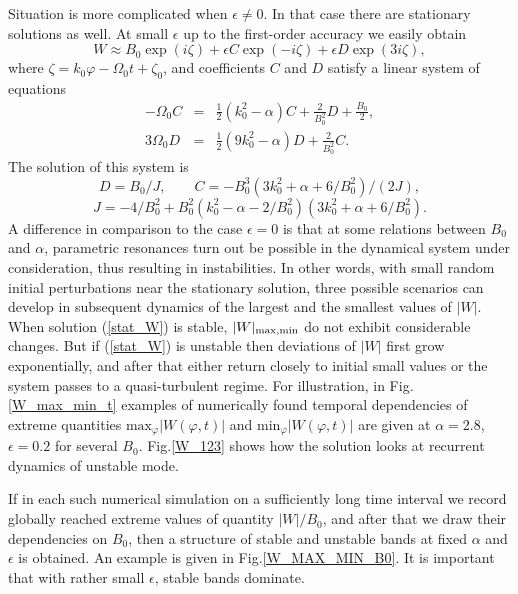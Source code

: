 \documentclass[pra,twocolumn,showpacs]{revtex4}
\begin{document}
Situation is more complicated when  $\epsilon\neq 0$. In that case there are stationary solutions 
as well. At small $\epsilon$ up to the first-order accuracy we easily obtain
\begin{equation}
W\approx B_0\exp(i\zeta)+\epsilon C\exp(-i\zeta) +\epsilon D\exp(3i\zeta),
\label{stat_W}
\end{equation}
where $\zeta=k_0\varphi -\Omega_0 t +\zeta_0$, and coefficients $C$ and $D$ 
satisfy a linear system of equations
\begin{eqnarray}
-\Omega_0 C&=&\frac{1}{2}(k_0^2-\alpha)C +\frac{2}{B_0^2} D+\frac{B_0}{2},\\
3\Omega_0 D&=&\frac{1}{2}(9k_0^2-\alpha)D +\frac{2}{B_0^2} C.
\end{eqnarray}
The solution of this system is
\begin{equation}
D=B_0/J, \qquad C=-B_0^3(3k_0^2+\alpha+6/B_0^2)/(2J), 
\end{equation}
\begin{equation}
J=-4/B_0^2+B_0^2(k_0^2-\alpha-2/B_0^2)(3k_0^2+\alpha+6/B_0^2).
\end{equation}
A difference in comparison to the case $\epsilon=0$ is that at some relations between $B_0$ and $\alpha$,
parametric resonances turn out be possible in the dynamical system under consideration, thus resulting in 
instabilities. In other words, with small random initial perturbations near the stationary solution, 
three possible scenarios can develop in subsequent dynamics of the largest and the smallest
values of  $|W|$. When solution (\ref{stat_W}) is stable, $|W|_{\rm max,min}$ do not exhibit considerable 
changes. But if  (\ref{stat_W}) is unstable then deviations of $|W|$ first grow exponentially, and after 
that either return closely to initial small values or the system passes to a quasi-turbulent regime.
For illustration, in Fig.\ref{W_max_min_t} examples of numerically found temporal dependencies of
extreme quantities $\mbox{max}_\varphi|W(\varphi,t)|$ and $\mbox{min}_\varphi|W(\varphi,t)|$ are given
at $\alpha=2.8$, $\epsilon=0.2$ for several $B_0$.
Fig.\ref{W_123} shows how the solution looks at recurrent dynamics of unstable mode.

If in each such numerical simulation on a sufficiently long time interval we record globally reached
extreme values of quantity $|W|/B_0$, and after that we draw their dependencies on $B_0$, then a structure
of stable and unstable bands at fixed $\alpha$ and $\epsilon$ is obtained. An example is given
in Fig.\ref{W_MAX_MIN_B0}. It is important that with rather small $\epsilon$, stable bands dominate.
\end{document}
